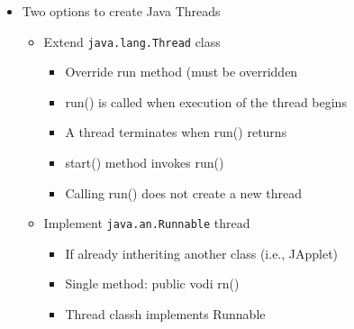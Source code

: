 \documentclass[a4paper]{article}
\newcommand{\inline}[1]{\lstinline!#1!}%
\begin{document}
\begin{itemize}
\begin{center}
			\end{center}
		\item Two options to create Java Threads
			\begin{itemize}
				\item Extend \inline{java.lang.Thread} class
					\begin{itemize}
						\item Override run method (must be overridden
						\item run() is called when execution of the thread begins
						\item A thread terminates when run() returns
						\item start() method invokes run()
						\item Calling run() does not create a new thread
					\end{itemize}
				\item Implement \inline{java.an.Runnable} thread
					\begin{itemize}
						\item If already intheriting another class (i.e., JApplet)
						\item Single method: public vodi rn()
						\item Thread classh implements Runnable
					\end{itemize}
			\end{itemize}

	\end{itemize}


\setcounter{section}{10}%
\end{document}
